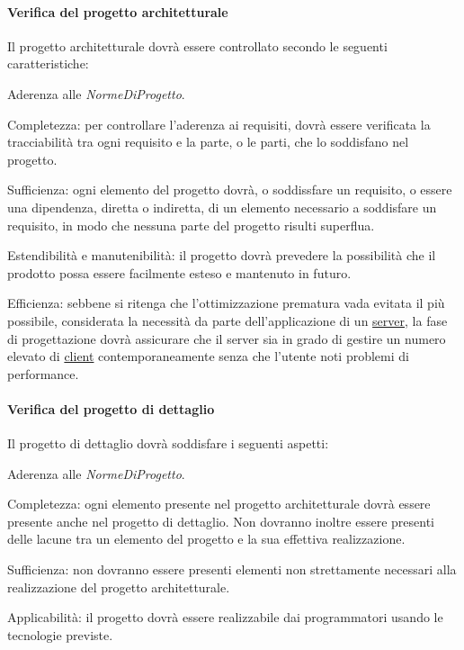 \paragraph{Verifica del progetto architetturale}
Il progetto architetturale dovr\`a essere controllato secondo le seguenti caratteristiche:
\begin{elenconumerato}[\textbf{}]{\subsubsecindent}
\item Aderenza alle \textit{NormeDiProgetto}.
\item Completezza: per controllare l'aderenza ai requisiti, dovr\`a essere verificata la tracciabilit\`a tra ogni requisito e la parte, o le parti, che lo soddisfano nel progetto.
\item Sufficienza: ogni elemento del progetto dovr\`a, o soddissfare un requisito, o essere una dipendenza, diretta o indiretta, di un elemento necessario a soddisfare un requisito, in modo che nessuna parte del progetto risulti superflua.
\item Estendibilit\`a e manutenibilit\`a: il progetto dovr\`a prevedere la possibilit\`a che il prodotto possa essere facilmente esteso e mantenuto in futuro.
\item Efficienza: sebbene si ritenga che l'ottimizzazione prematura vada evitata il pi\`u possibile, considerata la necessit\`a da parte dell'applicazione di un {\underline{server}}, la fase di progettazione dovr\`a assicurare che il server sia in grado di gestire un numero elevato di {\underline{client}} contemporaneamente senza che l'utente noti problemi di performance.
\end{elenconumerato}
\paragraph{Verifica del progetto di dettaglio}
Il progetto di dettaglio dovr\`a soddisfare i seguenti aspetti:
\begin{elenconumerato}[\textbf{}]{\subsubsecindent}
\item Aderenza alle \textit{NormeDiProgetto}.
\item Completezza: ogni elemento presente nel progetto architetturale dovr\`a essere presente anche nel progetto di dettaglio. Non dovranno inoltre essere presenti delle lacune tra un elemento del progetto e la sua effettiva realizzazione.
\item Sufficienza: non dovranno essere presenti elementi non strettamente necessari alla realizzazione del progetto architetturale.
\item Applicabilit\`a: il progetto dovr\`a essere realizzabile dai programmatori usando le tecnologie previste.
\end{elenconumerato}
